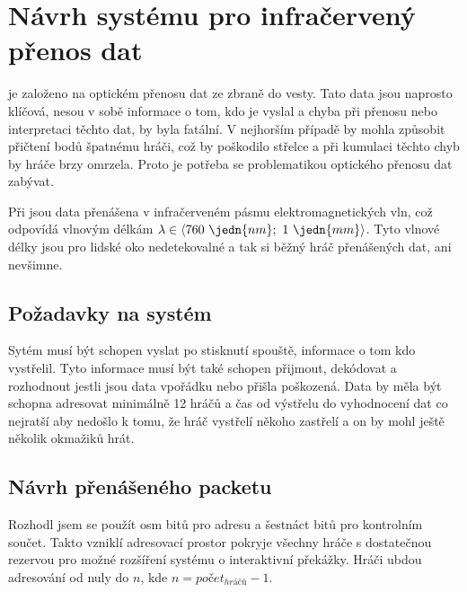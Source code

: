 \chapter{Návrh systému pro infračervený přenos dat}
 je založeno na optickém přenosu dat ze zbraně do vesty. Tato data jsou naprosto klíčová, nesou v sobě informace o tom, kdo je vyslal a chyba při přenosu nebo interpretaci těchto dat, by byla fatální. V nejhorším případě by mohla způsobit přičtení bodů špatnému hráči, což by poškodilo střelce a při kumulaci těchto chyb by  hráče brzy omrzela. Proto je potřeba se problematikou optického přenosu dat zabývat.

Při  jsou data přenášena v infračerveném pásmu elektromagnetických vln, což odpovídá vlnovým délkám $\lambda \in \langle 760~\jedn{nm};~1~\jedn{mm}\rangle$. Tyto vlnové délky jsou pro lidské oko nedetekovalné a tak si běžný hráč přenášených dat, ani nevšimne.

\section{Požadavky na systém}
Sytém musí být schopen vyslat po stisknutí spouště, informace o tom kdo vystřelil. Tyto informace musí být také schopen přijmout, dekódovat a rozhodnout jestli jsou data vpořádku nebo přišla poškozená. Data by měla být schopna adresovat minimálně 12 hráčů a čas od výstřelu do vyhodnocení dat co nejratší aby nedošlo k tomu, že hráč vystřelí někoho zastřelí a on by mohl ještě několik okmažiků hrát.

\section{Návrh přenášeného packetu}
Rozhodl jsem se použít osm bitů pro adresu a šestnáct bitů pro kontrolním součet. Takto vzniklí adresovací prostor pokryje všechny hráče s dostatečnou rezervou pro možné rozšíření systému o interaktivní překážky. Hráči ubdou adresování od nuly do $n$, kde $n = počet _{hráčů} - 1$.

